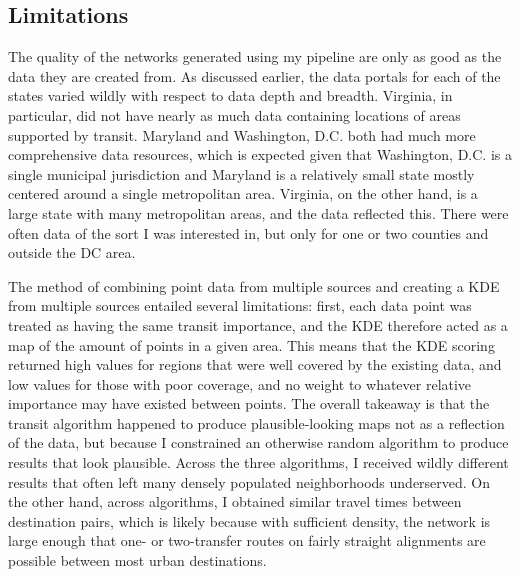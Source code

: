 \documentclass[manuscript,nonacm]{acmart}
\begin{document}

\subsection{Limitations}
The quality of the networks generated using my pipeline are only as good as the data they are created from. As discussed earlier, the data portals for each of the states varied wildly with respect to data depth and breadth. Virginia, in particular, did not have nearly as much data containing locations of areas supported by transit. Maryland and Washington, D.C. both had much more comprehensive data resources, which is expected given that Washington, D.C. is a single municipal jurisdiction and Maryland is a relatively small state mostly centered around a single metropolitan area. Virginia, on the other hand, is a large state with many metropolitan areas, and the data reflected this. There were often data of the sort I was interested in, but only for one or two counties and outside the DC area. 

The method of combining point data from multiple sources and creating a KDE from multiple sources entailed several limitations: first, each data point was treated as having the same transit importance, and the KDE therefore acted as a map of the amount of points in a given area. This means that the KDE scoring returned high values for regions that were well covered by the existing data, and low values for those with poor coverage, and no weight to whatever relative importance may have existed between points. The overall takeaway is that the transit algorithm happened to produce plausible-looking maps not as a reflection of the data, but because I constrained an otherwise random algorithm to produce results that look plausible. Across the three algorithms, I received wildly different results that often left many densely populated neighborhoods underserved. On the other hand, across algorithms, I obtained similar travel times between destination pairs, which is likely because with sufficient density, the network is large enough that one- or two-transfer routes on fairly straight alignments are possible between most urban destinations.
\end{document}
